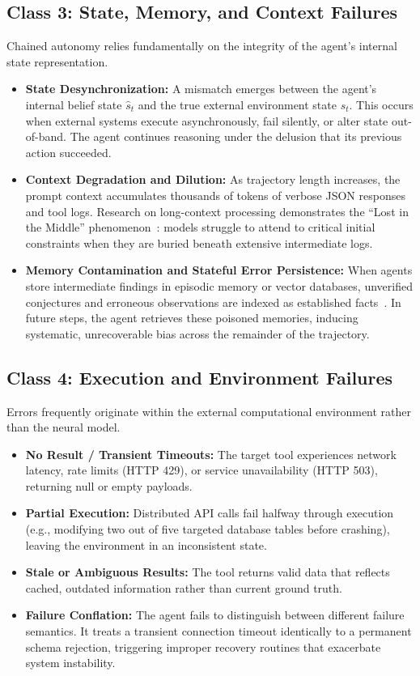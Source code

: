 \documentclass[conference]{IEEEtran}
\begin{document}
\subsection{Class 3: State, Memory, and Context Failures}
Chained autonomy relies fundamentally on the integrity of the agent's internal state representation.
\begin{itemize}
    \item \textbf{State Desynchronization:} A mismatch emerges between the agent's internal belief state $\hat{s}_t$ and the true external environment state $s_t$. This occurs when external systems execute asynchronously, fail silently, or alter state out-of-band. The agent continues reasoning under the delusion that its previous action succeeded.
    \item \textbf{Context Degradation and Dilution:} As trajectory length increases, the prompt context accumulates thousands of tokens of verbose JSON responses and tool logs. Research on long-context processing demonstrates the ``Lost in the Middle'' phenomenon~\cite{liu2024lost}: models struggle to attend to critical initial constraints when they are buried beneath extensive intermediate logs.
    \item \textbf{Memory Contamination and Stateful Error Persistence:} When agents store intermediate findings in episodic memory or vector databases, unverified conjectures and erroneous observations are indexed as established facts~\cite{zhang2025asb}. In future steps, the agent retrieves these poisoned memories, inducing systematic, unrecoverable bias across the remainder of the trajectory.
\end{itemize}

\subsection{Class 4: Execution and Environment Failures}
Errors frequently originate within the external computational environment rather than the neural model.
\begin{itemize}
    \item \textbf{No Result / Transient Timeouts:} The target tool experiences network latency, rate limits (HTTP 429), or service unavailability (HTTP 503), returning null or empty payloads.
    \item \textbf{Partial Execution:} Distributed API calls fail halfway through execution (e.g., modifying two out of five targeted database tables before crashing), leaving the environment in an inconsistent state.
    \item \textbf{Stale or Ambiguous Results:} The tool returns valid data that reflects cached, outdated information rather than current ground truth.
    \item \textbf{Failure Conflation:} The agent fails to distinguish between different failure semantics. It treats a transient connection timeout identically to a permanent schema rejection, triggering improper recovery routines that exacerbate system instability.
\end{itemize}
\end{document}
